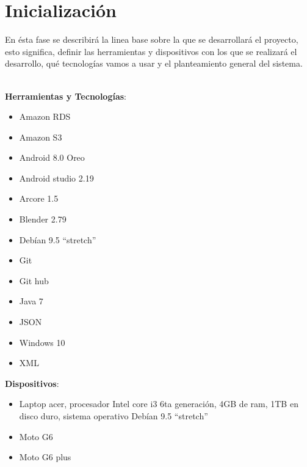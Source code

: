 \section{Inicialización}
En ésta fase se describirá la linea base sobre la que se desarrollará el proyecto, esto significa, definir las herramientas y dispositivos con los que se realizará el desarrollo, qué tecnologías vamos a usar y el planteamiento general del sistema.\par
\noindent
\\
\textbf{Herramientas y Tecnologías}:
	\begin{itemize}
			\item Amazon RDS
			\item Amazon S3
			\item Android 8.0 Oreo
			\item Android studio 2.19
			\item Arcore 1.5
			\item Blender 2.79
			\item Debían  9.5 “stretch”
			\item Git
			\item Git hub
			\item Java 7
	  		\item JSON
			\item Windows 10
			\item XML		
	\end{itemize}
	\noindent
\textbf{Dispositivos}:
\begin{itemize}
	\item Laptop acer, procesador Intel core i3 6ta generación, 4GB de ram, 1TB en disco duro, sistema operativo Debían  9.5 “stretch”
	\item Moto G6
	\item Moto G6 plus		
\end{itemize}
\noindent

